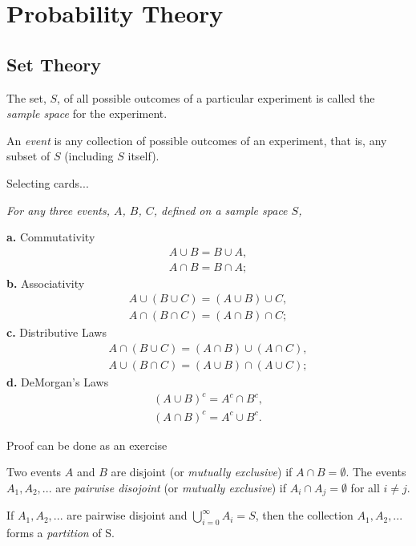 \section{Probability Theory}

\subsection{Set Theory}
\begin{defn}
    The set, $S$, of all possible outcomes of a particular experiment is called the \textit{sample space} for the experiment.
\end{defn}
\begin{defn}
    An \textit{event} is any collection of possible outcomes of an experiment, that is, any subset of $S$ (including $S$ itself).
\end{defn}
\begin{exmp} 
    Selecting cards...
\end{exmp}
\begin{thm}
    \textit{For any three events, $A$, $B$, $C$, defined on a sample space $S$,}
    
    \textbf{a.} Commutativity
    \begin{align*}
        A \cup B = B \cup A, \\
        A \cap B = B \cap A;
    \end{align*}
    \textbf{b.} Associativity
    \begin{align*}
        A \cup (B \cup C) = (A \cup B) \cup C, \\
        A \cap (B \cap C) = (A \cap B) \cap C;
    \end{align*}
    \textbf{c.} Distributive Laws
    \begin{align*}
        A \cap (B \cup C) = (A \cap B) \cup (A \cap C), \\
        A \cup (B \cap C) = (A \cup B) \cap (A \cup C);
    \end{align*}
    \textbf{d.} DeMorgan's Laws
    \begin{align*}
        (A \cup B)^c = A^c \cap B^c, \\
        (A \cap B)^c = A^c \cup B^c.
    \end{align*}
\end{thm}
Proof can be done as an exercise
\begin{defn}
    Two events $A$ and $B$ are disjoint (or \textit{mutually exclusive}) if $A \cap B = \emptyset$. The events $A_1, A_2, ...$ are \textit{pairwise disojoint} (or \textit{mutually exclusive}) if $A_i \cap A_j = \emptyset$ for all $i \neq j$.
\end{defn}
\begin{defn}
    If $A_1, A_2, ...$ are pairwise disjoint and $\bigcup^\infty_{i = 0} A_i = S$, then the collection $A_1, A_2, ...$ forms a \textit{partition} of S.
\end{defn}

